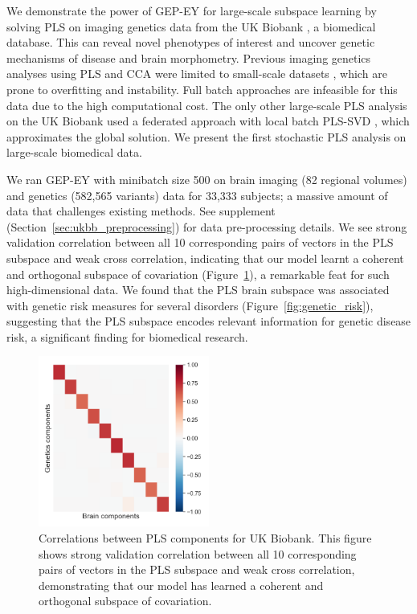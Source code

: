 We demonstrate the power of GEP-EY for large-scale subspace learning by solving PLS on imaging genetics data from the UK Biobank \citep{sudlow2015uk}, a biomedical database.
This can reveal novel phenotypes of interest and uncover genetic mechanisms of disease and brain morphometry.
Previous imaging genetics analyses using PLS and CCA were limited to small-scale datasets \citep{Lorenzi2018,Taquet2021,Lefloch2012}, which are prone to overfitting and instability.
Full batch approaches are infeasible for this data due to the high computational cost.
The only other large-scale PLS analysis on the UK Biobank used a federated approach with local batch PLS-SVD \citep{lorenzi2016}, which approximates the global solution.
We present the first stochastic PLS analysis on large-scale biomedical data.

We ran GEP-EY with minibatch size 500 on brain imaging (82 regional volumes) and genetics (582,565 variants) data for 33,333 subjects; a massive amount of data that challenges existing methods.
See supplement (Section~\ref{sec:ukbb_preprocessing}) for data pre-processing details.
We see strong validation correlation between all 10 corresponding pairs of vectors in the PLS subspace and weak cross correlation, indicating that our model learnt a coherent and orthogonal subspace of covariation (Figure~\ref{fig:UKBB_corr}), a remarkable feat for such high-dimensional data.
We found that the PLS brain subspace was associated with genetic risk measures for several disorders (Figure~\ref{fig:genetic_risk}), suggesting that the PLS subspace encodes relevant information for genetic disease risk, a significant finding for biomedical research.


\begin{figure}
    \centering
    \includegraphics[width=0.5\textwidth,trim={0.8cm 0cm 0.3cm 0cm}]{figures/gradient_descent/UKBB/cross_corr}
    \caption{Correlations between PLS components for UK Biobank. This figure shows strong validation correlation between all 10 corresponding pairs of vectors in the PLS subspace and weak cross correlation, demonstrating that our model has learned a coherent and orthogonal subspace of covariation.}
    \label{fig:UKBB_corr}
\end{figure}


